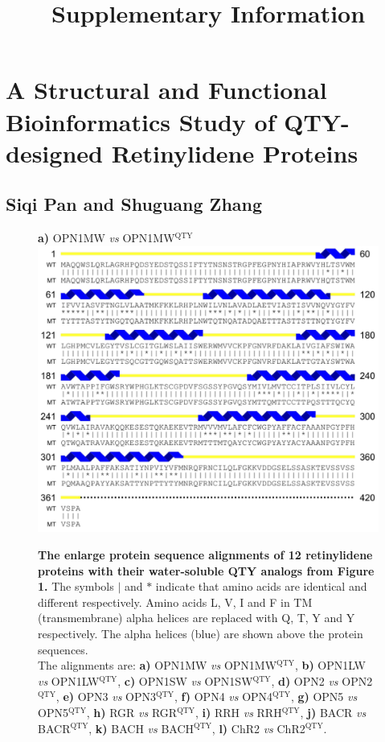 \documentclass[fleqn,12pt]{supp}
\title{Supplementary Information}
\author{}
\begin{document}
\flushbottom
\maketitle

\vspace{-35pt}
\section*{A Structural and Functional Bioinformatics Study of QTY-designed Retinylidene Proteins}

\subsection*{Siqi Pan and Shuguang Zhang}

\begin{figure}[H]
    \caption{\textbf{The enlarge protein sequence alignments of 12 retinylidene proteins with their water-soluble QTY analogs from Figure 1.} The symbols $|$ and $*$ indicate that amino acids are identical and different respectively. Amino acids L, V, I and F in TM (transmembrane) alpha helices are replaced with Q, T, Y and Y respectively. The alpha helices (blue) are shown above the protein sequences. \\
    The alignments are: 
    \textbf{a)} OPN1MW \textit{vs} OPN1MW$^{\textrm{QTY}}$, 
    \textbf{b)} OPN1LW \textit{vs} OPN1LW$^{\textrm{QTY}}$, 
    \textbf{c)} OPN1SW \textit{vs} OPN1SW$^{\textrm{QTY}}$, 
    \textbf{d)} OPN2 \textit{vs} OPN2$^{\textrm{QTY}}$, 
    \textbf{e)} OPN3 \textit{vs} OPN3$^{\textrm{QTY}}$, 
    \textbf{f)} OPN4 \textit{vs} OPN4$^{\textrm{QTY}}$, 
    \textbf{g)} OPN5 \textit{vs} OPN5$^{\textrm{QTY}}$, 
    \textbf{h)} RGR \textit{vs} RGR$^{\textrm{QTY}}$, 
    \textbf{i)} RRH \textit{vs} RRH$^{\textrm{QTY}}$, 
    \textbf{j)} BACR \textit{vs} BACR$^{\textrm{QTY}}$, 
    \textbf{k)} BACH \textit{vs} BACH$^{\textrm{QTY}}$, 
    \textbf{l)} ChR2 \textit{vs} ChR2$^{\textrm{QTY}}$. }
    \textbf{a)} OPN1MW \textit{vs} OPN1MW$^{\textrm{QTY}}$ \\
    \includegraphics[width=\linewidth]{SuppFigures/opn1mw.jpg}
\end{figure}
\end{document}
